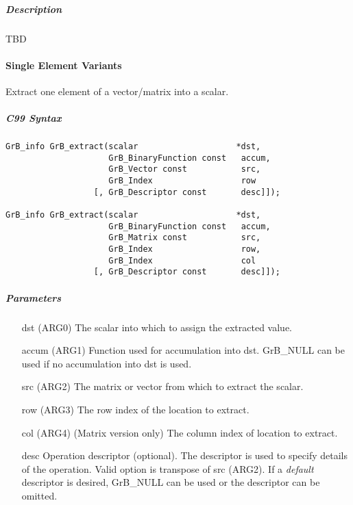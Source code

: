 \subparagraph{Description}

TBD

\paragraph{Single Element Variants}

Extract one element of a vector/matrix into a scalar.  



\subparagraph{C99 Syntax}

\begin{verbatim}
GrB_info GrB_extract(scalar                    *dst, 
                     GrB_BinaryFunction const   accum,
                     GrB_Vector const           src,
                     GrB_Index                  row
                  [, GrB_Descriptor const       desc]]);

GrB_info GrB_extract(scalar                    *dst,
                     GrB_BinaryFunction const   accum,
                     GrB_Matrix const           src,
                     GrB_Index                  row,
                     GrB_Index                  col
                  [, GrB_Descriptor const       desc]]);

\end{verbatim}

\subparagraph{Parameters}

\begin{itemize}[leftmargin=1in]
	\item[{\sf dst (ARG0)}]   The scalar into which to assign the extracted value.
	\item[{\sf accum (ARG1)}] Function used for accumulation into dst.  {\sf GrB\_NULL}
                              can be used if no accumulation into dst is used.
	\item[{\sf src (ARG2)}]   The matrix or vector from which to extract the scalar.
	\item[{\sf row (ARG3)}]   The row index of the location to extract.
	\item[{\sf col (ARG4)}]   (Matrix version only) The column index of location to extract.
    \item[{\sf desc}]         Operation descriptor (optional). The descriptor
                              is used to specify details of the operation. Valid option is
                              transpose of src ({\sf ARG2}). If a \emph{default} descriptor
                              is desired,	{\sf GrB\_NULL} can be used or the descriptor
                              can be omitted.  
\end{itemize}

